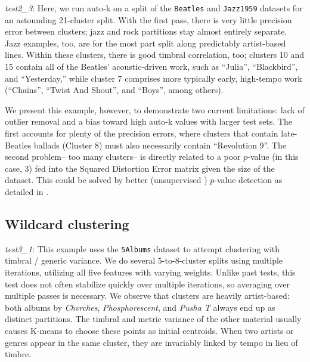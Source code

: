 \documentclass[12pt,twocolumn,titlepage]{article}
\begin{document}
\emph{test2\_3}: Here, we run auto-k on a split of the \texttt{Beatles} and \texttt{Jazz1959} datasets for an astounding 21-cluster split. With the first pass, there is very little precision error between clusters; jazz and rock partitions stay almost entirely separate. Jazz examples, too, are for the most part split along predictably artist-based lines. Within these clusters, there is good timbral correlation, too; clusters 10 and 15 contain all of the Beatles' acoustic-driven work, such as ``Julia'', ``Blackbird'', and ``Yesterday,'' while cluster 7 comprises more typically early, high-tempo work (``Chains'', ``Twist And Shout'', and ``Boys'', among others). 

We present this example, however, to demonstrate two current limitations: lack of outlier removal and a bias toward high auto-k values with larger test sets. The first accounts for plenty of the precision errors, where clusters that contain late-Beatles ballads (Cluster 8) must also necessarily contain ``Revolution 9''. The second problem-- too many clusters-- is directly related to a poor $p$-value (in this case, 3) fed into the Squared Distortion Error matrix given the size of the dataset. This could be solved by better (unsupervised ) $p$-value detection as detailed in \cite{SemiSupPNorm}.

\subsection{Wildcard clustering}

\emph{test3\_1}: This example uses the \texttt{5Albums} dataset to attempt clustering with timbral / generic variance. We do several 5-to-8-cluster splits using multiple iterations, utilizing all five features with varying weights. Unlike past tests, this test does not often stabilize quickly over multiple iterations, so averaging over multiple passes is necessary. We observe that clusters are heavily artist-based: both albums by \emph{Chvrches}, \emph{Phosphorescent}, and \emph{Pusha T} always end up as distinct partitions. The timbral and metric variance of the other material usually causes K-means to choose these points as initial centroids. When two artists or genres appear in the same cluster, they are invariably linked by tempo in lieu of timbre. 
\end{document}
